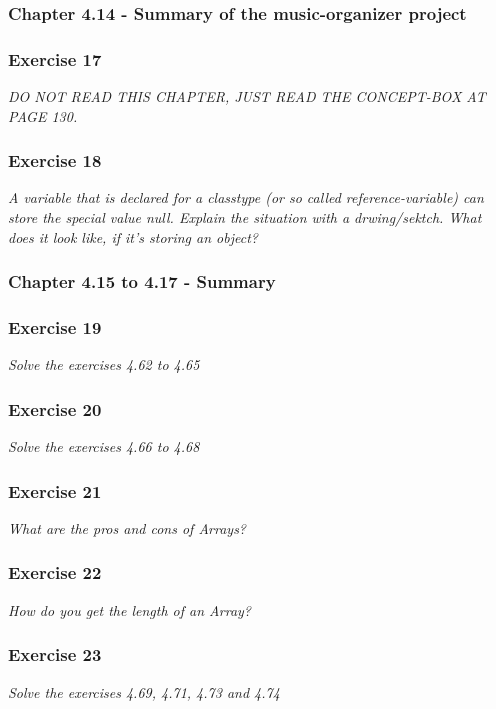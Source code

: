 \subsubsection{Chapter 4.14 - Summary of the music-organizer project}

\subsubsection*{Exercise 17}
\textit{DO NOT READ THIS CHAPTER, JUST READ THE CONCEPT-BOX AT PAGE 130.}\\

\subsubsection*{Exercise 18}
\textit{A variable that is declared for a classtype (or so called 
reference-variable) can store the special value null. Explain the situation 
with a drwing/sektch. What does it look like, if it's storing an object?}\\

\subsubsection{Chapter 4.15 to 4.17 - Summary}

\subsubsection*{Exercise 19}
\textit{Solve the exercises 4.62 to 4.65}\\

\subsubsection*{Exercise 20}
\textit{Solve the exercises 4.66 to 4.68}\\

\subsubsection*{Exercise 21}
\textit{What are the pros and cons of Arrays?}\\

\subsubsection*{Exercise 22}
\textit{How do you get the length of an Array?}\\

\subsubsection*{Exercise 23}
\textit{Solve the exercises 4.69, 4.71, 4.73 and 4.74}\\




